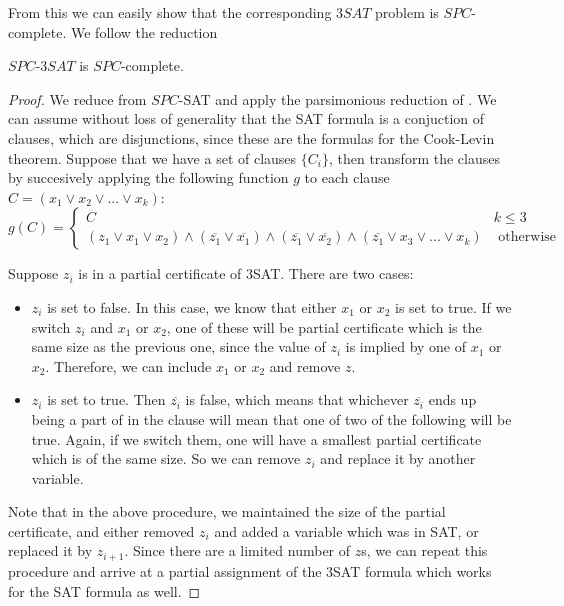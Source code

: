 \documentclass[runningheads,a4paper]{llncs}
\begin{document}
From this we can easily show that the corresponding $3SAT$ problem is $SPC$-complete. We follow the reduction 

\begin{proposition}
$SPC$-$3SAT$ is $SPC$-complete.
\end{proposition}

\begin{proof}
We reduce from $SPC$-SAT and apply the parsimonious reduction of \cite{yaleclass}. We can assume without loss of generality that the SAT formula is a conjuction of clauses, which are disjunctions, since these are the formulas for the Cook-Levin theorem. Suppose that we have a set of clauses $\{ C_i \}$, then transform the clauses by succesively applying the following function $g$ to each clause $C = (x_1 \vee x_2 \vee ... \vee x_k)$:
\[ g(C) = \left\{ \begin{array}{cc} C & k \leq 3 \\
						    (z_1 \vee x_1 \vee x_2) \wedge (\overline{z_1} \vee \overline{x_1}) \wedge (\overline{z_1} \vee \overline{x_2}) \wedge (\overline{z_1} \vee x_3 \vee ... \vee x_k) & \text{ otherwise }\end{array} \right. \] 

Suppose $z_i$ is in a partial certificate of 3SAT. There are two cases:
\begin{itemize}
\item $z_i$ is set to false. In this case, we know that either $x_1$ or $x_2$ is set to true. If we switch $z_i$ and $x_1$ or $x_2$, one of these will be partial certificate which is the same size as the previous one, since the value of $z_i$ is implied by one of $x_1$ or $x_2$. Therefore, we can include $x_1$ or $x_2$ and remove $z$.
\item $z_i$ is set to true. Then $\overline{z_i}$ is false, which means that whichever $\overline{z_i}$ ends up being a part of in the clause will mean that one of two of the following will be true. Again, if we switch them, one will have a smallest partial certificate which is of the same size. So we can remove $z_i$ and replace it by another variable. 
\end{itemize}
Note that in the above procedure, we maintained the size of the partial certificate, and either removed $z_i$ and added a variable which was in SAT, or replaced it by $z_{i+1}$. Since there are a limited number of $z$s, we can repeat this procedure and arrive at a partial assignment of the 3SAT formula which works for the SAT formula as well.
\end{proof}
\end{document}
